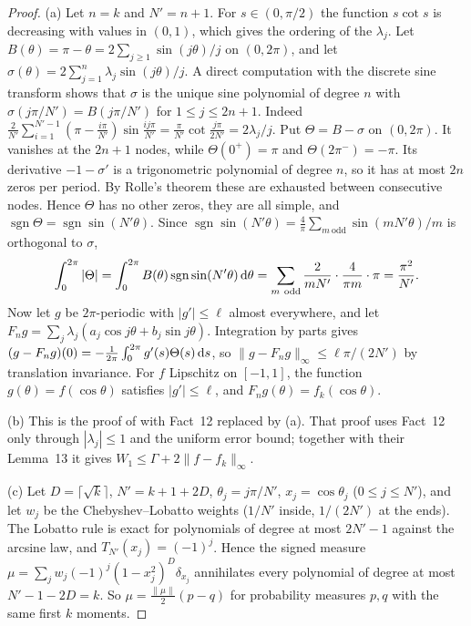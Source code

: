 \documentclass[11pt]{amsart}
\theoremstyle{definition}
\theoremstyle{remark}
\begin{document}
\begin{proof}
(a) Let $n=k$ and $N'=n+1$.  For $s\in(0,\pi/2)$ the function $s\cot s$ is
decreasing with values in $(0,1)$, which gives the ordering of the
$\lambda_j$.  Let $B(\theta)=\pi-\theta=2\sum_{j\ge1}\sin(j\theta)/j$ on
$(0,2\pi)$, and let $\sigma(\theta)=2\sum_{j=1}^n\lambda_j\sin(j\theta)/j$.
A direct computation with the discrete sine transform shows that $\sigma$
is the unique sine polynomial of degree $n$ with
$\sigma(j\pi/N')=B(j\pi/N')$ for $1\le j\le2n+1$.  Indeed
$\frac2{N'}\sum_{i=1}^{N'-1}(\pi-\frac{i\pi}{N'})\sin\frac{ij\pi}{N'}
=\frac\pi{N'}\cot\frac{j\pi}{2N'}=2\lambda_j/j$.  Put $\Theta=B-\sigma$ on
$(0,2\pi)$.  It vanishes at the $2n+1$ nodes, while $\Theta(0^+)=\pi$ and
$\Theta(2\pi^-)=-\pi$.  Its derivative $-1-\sigma'$ is a trigonometric
polynomial of degree $n$, so it has at most $2n$ zeros per period.  By
Rolle's theorem these are exhausted between consecutive nodes.  Hence
$\Theta$ has no other zeros, they are all simple, and
$\operatorname{sgn}\Theta=\operatorname{sgn}\sin(N'\theta)$.  Since
$\operatorname{sgn}\sin(N'\theta)=\frac4\pi\sum_{m\ \mathrm{odd}}\sin(mN'\theta)/m$
is orthogonal to $\sigma$,
\[
 \int_0^{2\pi}|\Theta|=\int_0^{2\pi}B(\theta)\operatorname{sgn}\sin(N'\theta)\,\mathrm{d}\theta
 =\sum_{m\ \mathrm{odd}}\frac{2}{mN'}\cdot\frac{4}{\pi m}\cdot\pi=\frac{\pi^2}{N'} .
\]
Now let $g$ be $2\pi$-periodic with $|g'|\le\ell$ almost everywhere, and let
$F_ng=\sum_j\lambda_j(a_j\cos j\theta+b_j\sin j\theta)$.  Integration by parts
gives $(g-F_ng)(0)=-\frac1{2\pi}\int_0^{2\pi}g'(s)\Theta(s)\,\mathrm{d} s$, so
$\|g-F_ng\|_\infty\le\ell\pi/(2N')$ by translation invariance.  For $f$
Lipschitz on $[-1,1]$, the function $g(\theta)=f(\cos\theta)$ satisfies
$|g'|\le\ell$, and $F_ng(\theta)=f_k(\cos\theta)$.

(b) This is the proof of \cite[Thm.~1]{R5-MMRS25} with Fact~12 replaced by
(a).  That proof uses Fact~12 only through $|\lambda_j|\le1$ and the uniform
error bound; together with their Lemma~13 it gives
$W_1\le\Gamma+2\|f-f_k\|_\infty$.

(c) Let $D=\lceil\sqrt k\rceil$, $N'=k+1+2D$, $\theta_j=j\pi/N'$,
$x_j=\cos\theta_j$ ($0\le j\le N'$), and let $w_j$ be the Chebyshev--Lobatto
weights ($1/N'$ inside, $1/(2N')$ at the ends).  The Lobatto rule is exact
for polynomials of degree at most $2N'-1$ against the arcsine law, and
$T_{N'}(x_j)=(-1)^j$.  Hence the signed measure
$\mu=\sum_jw_j(-1)^j(1-x_j^2)^D\delta_{x_j}$ annihilates every polynomial of
degree at most $N'-1-2D=k$.  So $\mu=\frac{\|\mu\|}2(p-q)$ for probability
measures $p,q$ with the same first $k$ moments.


\end{proof}
\end{document}
